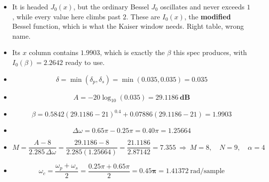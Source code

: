 \begin{itemize}
  \item {} It is headed
        $J_0(x)$, but the ordinary Bessel $J_0$ oscillates and never exceeds $1$, while
        every value here climbs past $2$. These are $I_0(x)$, the \textbf{modified}
        Bessel function, which is what the Kaiser window needs. Right table, wrong name.
  \item {} Its $x$ column contains $1.9903$, which is
        exactly the $\beta$ this spec produces, with $I_0(\beta)=2.2642$ ready to use.
\end{itemize}

\begin{itemize}
  \item[] \[ \delta=\min(\delta_p,\delta_s)=\min(0.035,0.035)=\mathbf{0.035} \]
  \item[] \[ A=-20\log_{10}(0.035)=\mathbf{29.1186\ \text{dB}} \]
  \item[] \[ \beta=0.5842(29.1186-21)^{0.4}+0.07886(29.1186-21)=\mathbf{1.9903} \]
  \item[] \[ \Delta\omega=0.65\pi-0.25\pi=0.40\pi=1.25664 \]
  \item[] \[ M=\frac{A-8}{2.285\,\Delta\omega}=\frac{29.1186-8}{2.285(1.25664)}
             =\frac{21.1186}{2.87142}=7.355\ \Rightarrow\ M=8,\quad
             \boxed{N=9},\quad \alpha=4 \]
\end{itemize}

\begin{itemize}
  \item[] \[ \omega_c=\frac{\omega_p+\omega_s}{2}=\frac{0.25\pi+0.65\pi}{2}
             =\mathbf{0.45\pi}=1.41372\ \text{rad/sample} \]
\end{itemize}

